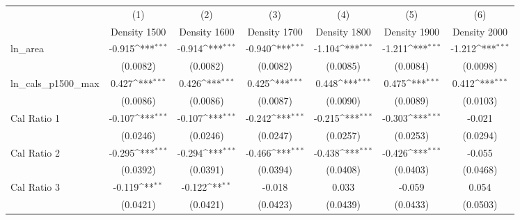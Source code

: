 {
\def\sym#1{\ifmmode^{#1}\else\(^{#1}\)\fi}
\begin{tabular}{l*{6}{c}}
\toprule
                    &\multicolumn{1}{c}{(1)}&\multicolumn{1}{c}{(2)}&\multicolumn{1}{c}{(3)}&\multicolumn{1}{c}{(4)}&\multicolumn{1}{c}{(5)}&\multicolumn{1}{c}{(6)}\\
                    &\multicolumn{1}{c}{Density 1500}&\multicolumn{1}{c}{Density 1600}&\multicolumn{1}{c}{Density 1700}&\multicolumn{1}{c}{Density 1800}&\multicolumn{1}{c}{Density 1900}&\multicolumn{1}{c}{Density 2000}\\
\midrule
ln\_area             &      -0.915\sym{***}&      -0.914\sym{***}&      -0.940\sym{***}&      -1.104\sym{***}&      -1.211\sym{***}&      -1.212\sym{***}\\
                    &    (0.0082)         &    (0.0082)         &    (0.0082)         &    (0.0085)         &    (0.0084)         &    (0.0098)         \\
\addlinespace
ln\_cals\_p1500\_max   &       0.427\sym{***}&       0.426\sym{***}&       0.425\sym{***}&       0.448\sym{***}&       0.475\sym{***}&       0.412\sym{***}\\
                    &    (0.0086)         &    (0.0086)         &    (0.0087)         &    (0.0090)         &    (0.0089)         &    (0.0103)         \\
\addlinespace
Cal Ratio 1         &      -0.107\sym{***}&      -0.107\sym{***}&      -0.242\sym{***}&      -0.215\sym{***}&      -0.303\sym{***}&      -0.021         \\
                    &    (0.0246)         &    (0.0246)         &    (0.0247)         &    (0.0257)         &    (0.0253)         &    (0.0294)         \\
\addlinespace
Cal Ratio 2         &      -0.295\sym{***}&      -0.294\sym{***}&      -0.466\sym{***}&      -0.438\sym{***}&      -0.426\sym{***}&      -0.055         \\
                    &    (0.0392)         &    (0.0391)         &    (0.0394)         &    (0.0408)         &    (0.0403)         &    (0.0468)         \\
\addlinespace
Cal Ratio 3         &      -0.119\sym{**} &      -0.122\sym{**} &      -0.018         &       0.033         &      -0.059         &       0.054         \\
                    &    (0.0421)         &    (0.0421)         &    (0.0423)         &    (0.0439)         &    (0.0433)         &    (0.0503)         \\

\end{tabular}}
